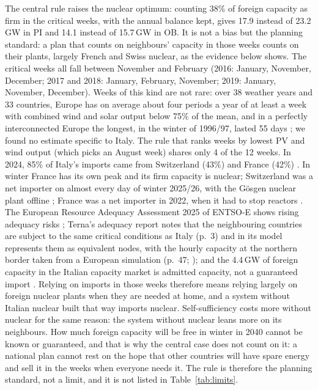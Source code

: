 The central rule raises the nuclear optimum: counting 38\% of foreign capacity as firm in the critical weeks, with the annual balance kept, gives 17.9 instead of 23.2\,GW in PI and 14.1 instead of 15.7\,GW in OB. It is not a bias but the planning standard: a plan that counts on neighbours' capacity in those weeks counts on their plants, largely French and Swiss nuclear, as the evidence below shows. The critical weeks all fall between November and February (2016: January, November, December; 2017 and 2018: January, February, November; 2019: January, November, December). Weeks of this kind are not rare: over 38 weather years and 33 countries, Europe has on average about four periods a year of at least a week with combined wind and solar output below 75\% of the mean, and in a perfectly interconnected Europe the longest, in the winter of 1996/97, lasted 55 days \citep{KittelSchill2024}; we found no estimate specific to Italy. The rule that ranks weeks by lowest PV and wind output (which picks an August week) shares only 4 of the 12 weeks. In 2024, 85\% of Italy's imports came from Switzerland (43\%) and France (42\%) \citep{Sole2024imports}. In winter France has its own peak and its firm capacity is nuclear; Switzerland was a net importer on almost every day of winter 2025/26, with the Gösgen nuclear plant offline \citep{Economiesuisse2025}; France was a net importer in 2022, when it had to stop reactors \citep{BdF2023}. The European Resource Adequacy Assessment 2025 of ENTSO-E shows rising adequacy risks \citep{ERAA2025}; Terna's adequacy report notes that the neighbouring countries are subject to the same critical conditions as Italy (p.~3) and in its model represents them as equivalent nodes, with the hourly capacity at the northern border taken from a European simulation (p.~47; \citealp{TernaAdeq2024}); and the 4.4\,GW of foreign capacity in the Italian capacity market is admitted capacity, not a guaranteed import \citep{TernaCM2025}. Relying on imports in those weeks therefore means relying largely on foreign nuclear plants when they are needed at home, and a system without Italian nuclear built that way imports nuclear. Self-sufficiency costs more without nuclear for the same reason: the system without nuclear leans more on its neighbours. How much foreign capacity will be free in winter in 2040 cannot be known or guaranteed, and that is why the central case does not count on it: a national plan cannot rest on the hope that other countries will have spare energy and sell it in the weeks when everyone needs it. The rule is therefore the planning standard, not a limit, and it is not listed in Table~\ref{tab:limits}.

